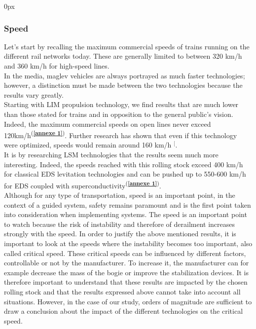 \documentclass[12pt, a4paper, onecolumn]{article}
\makeatletter
\renewcommand{\tab}{\tabto{15px}}
\newcommand{\csvdel}{}
\newcommand{\bettercite}[1][,]{%
  \renewcommand{\csvdel}{\renewcommand{\csvdel}{}}%
  \csname\endcsname$^[$\checknextarg}
\newcommand{\checknextarg}{\@ifnextchar\bgroup{\gobblenext}{}}%
\newcommand{\gobblenext}[1]{\csvdel\textcolor{blue}{\textbf{\cite{#1}}}\@ifnextchar\bgroup{$^,$\gobblenext}{$^]$}}%
\newcommand{\cfannexe}[1]{\textsuperscript{(\textcolor{blue}{\textbf{\ref{annexe #1}}})}}
\makeatother
\begin{document}
\begin{addmargin}[30px]{0px} \subsubsection*{Speed}\end{addmargin}
\tab Let's start by recalling the maximum commercial speeds of trains running on the different rail networks today. These are generally limited to between 320 km/h and 360 km/h for high-speed lines. \\
\tab In the media, maglev vehicles are always portrayed as much faster technologies; however, a distinction must be made between the two technologies because the results vary greatly. \\
\linebreak
\tab Starting with LIM propulsion technology, we find results that are much lower than those stated for trains and in opposition to the general public's vision.
Indeed, the maximum commercial speeds on open lines never exceed 120km/h\cfannexe{1}.
Further research has shown that even if this technology were optimized, speeds would remain around 160 km/h\bettercite{optimisationchangsha}. \\
\linebreak
\tab It is by researching LSM technologies that the results seem much more interesting.
Indeed, the speeds reached with this rolling stock exceed 400 km/h for classical EDS levitation technologies and can be pushed up to 550-600 km/h for EDS coupled with superconductivity\cfannexe{1}. \\
\linebreak
\tab Although for any type of transportation, speed is an important point, in the context of a guided system, safety remains paramount and is the first point taken into consideration when implementing systems.
The speed is an important point to watch because the risk of instability and therefore of derailment increases strongly with the speed.
In order to justify the above mentioned results, it is important to look at the speeds where the instability becomes too important, also called critical speed.
\pagebreak  %
These critical speeds can be influenced by different factors, controllable or not by the manufacturer.
To increase it, the manufacturer can for example decrease the mass of the bogie or improve the stabilization devices.
It is therefore important to understand that these results are impacted by the chosen rolling stock and that the results expressed above cannot take into account all situations. However, in the case of our study, orders of magnitude are sufficient to draw a conclusion about the impact of the different technologies on the critical speed. \\
\end{document}
